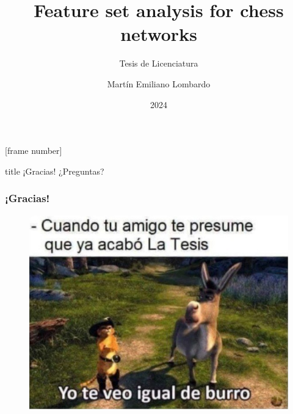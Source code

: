 \usepackage{../common}

\usepackage[absolute,overlay]{textpos}

\renewcommand{\figurename}{Figura}

\title{Feature set analysis for chess  networks}
\subtitle{Tesis de Licenciatura}
\author{Martín Emiliano Lombardo}
\date{2024}

[frame number]{}




\frame{\titlepage}









\begin{frame}
\vfill
\centering
\begin{beamercolorbox}[sep=8pt,center,shadow=false,rounded=false]{title}
    ¡Gracias! ¿Preguntas?
    \par%
\end{beamercolorbox}
\vfill
\end{frame}

\begin{frame}
\frametitle{¡Gracias!}
\begin{figure}
    \centering
    \includegraphics[width=0.6\linewidth]{../assets/endmeme.png}
\end{figure}
\end{frame}


